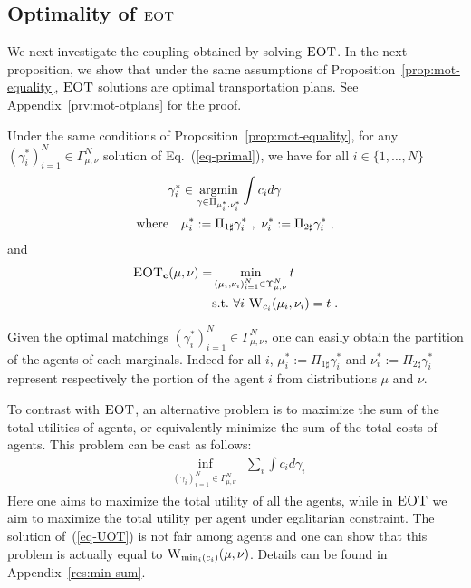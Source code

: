 \subsection{Optimality of $\textsc{EOT}$} 
We next investigate the coupling obtained by solving $\textsc{EOT}$. In the next proposition, we show that under the same assumptions of Proposition~\ref{prop:mot-equality}, $\textsc{EOT}$ solutions are optimal transportation plans. See Appendix~\ref{prv:mot-otplans} for the proof.
\begin{prop}
\label{prop:mot-otplans}
Under the same conditions of Proposition~\ref{prop:mot-equality}, for any $(\gamma_i^{*})_{i=1}^N\in\Gamma^N_{\mu,\nu}$ solution of Eq.~(\ref{eq-primal}), we have for all $i\in\{1,\dots,N\}$
\begin{equation}
  \begin{aligned}
  \label{eq-optimal-coupling}
    \gamma_i^{*}&\in\operatorname*{argmin}_{\gamma\in\Pi_{\mu_i^{*},\nu_i^{*}}}  \int c_i d\gamma\\
    \text{where\quad} & \mu_i^{*}:=\Pi_{1\sharp}\gamma_i^{*} ~,~ \nu_i^{*}:=\Pi_{2\sharp}\gamma_i^{*}\; ,
\end{aligned}
\end{equation}
and
\begin{equation}
\begin{aligned}
\label{eq-mot-optimality}
  \textsc{EOT}_{\mathbf{c}}(\mu,\nu)=  &\min_{\substack{(\mu_i,\nu_i)_{i=1}^N\in\Upsilon^N_{\mu,\nu}}} t\\
  &\mathrm{s.t.}~ \forall i~ \textsc{W}_{c_i}(\mu_i,\nu_i) =t \; .
\end{aligned}
\end{equation}
\end{prop}

Given the optimal matchings $(\gamma_i^{*})_{i=1}^N\in\Gamma^N_{\mu,\nu}$, one can easily obtain the partition of the agents of each marginals. Indeed for all $i$, $\mu_i^{*}:=\Pi_{1\sharp}\gamma_i^{*}$ and $ \nu_i^{*}:=\Pi_{2\sharp}\gamma_i^{*}$ represent respectively the portion of the agent $i$ from distributions $\mu$ and $\nu$.

\begin{rmq}
To contrast with $\textsc{EOT}$, an alternative problem is to maximize the sum of the total utilities of agents, or equivalently minimize the sum of the total costs of agents. This problem can be cast as follows:
\begin{align}
\label{eq-UOT}
  \inf_{\substack{(\gamma_i)_{i=1}^N\in\Gamma^N_{\mu,\nu}\
}}  \sum_i \int c_i d\gamma_i
\end{align}
Here one aims to maximize the total utility of all the agents, while in $\textsc{EOT}$ we aim to maximize the total utility per agent under egalitarian constraint. The solution of~(\ref{eq-UOT}) is not fair among agents and one can show that this problem is actually equal to $\textsc{W}_{\min_i (c_i)}(\mu,\nu)$. Details can be found in Appendix~\ref{res:min-sum}.
\end{rmq} 



